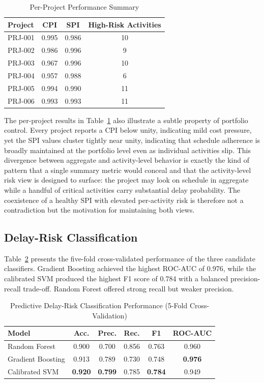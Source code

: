 \documentclass[conference]{IEEEtran}
\begin{document}
\begin{table}[t]
\caption{Per-Project Performance Summary}
\label{tab:projects}
\centering
\footnotesize
\begin{tabular}{@{}lccc@{}}
\toprule
\textbf{Project} & \textbf{CPI} & \textbf{SPI} & \textbf{High-Risk Activities} \\
\midrule
PRJ-001 & 0.995 & 0.986 & 10 \\
PRJ-002 & 0.986 & 0.996 & 9 \\
PRJ-003 & 0.967 & 0.996 & 10 \\
PRJ-004 & 0.957 & 0.988 & 6 \\
PRJ-005 & 0.994 & 0.990 & 11 \\
PRJ-006 & 0.993 & 0.993 & 11 \\
\bottomrule
\end{tabular}
\end{table}

The per-project results in Table~\ref{tab:projects} also illustrate a subtle property of portfolio control. Every project reports a CPI below unity, indicating mild cost pressure, yet the SPI values cluster tightly near unity, indicating that schedule adherence is broadly maintained at the portfolio level even as individual activities slip. This divergence between aggregate and activity-level behavior is exactly the kind of pattern that a single summary metric would conceal and that the activity-level risk view is designed to surface: the project may look on schedule in aggregate while a handful of critical activities carry substantial delay probability. The coexistence of a healthy SPI with elevated per-activity risk is therefore not a contradiction but the motivation for maintaining both views.

\subsection{Delay-Risk Classification}

Table~\ref{tab:results} presents the five-fold cross-validated performance of the three candidate classifiers. Gradient Boosting achieved the highest ROC-AUC of 0.976, while the calibrated SVM produced the highest F1 score of 0.784 with a balanced precision-recall trade-off. Random Forest offered strong recall but weaker precision.

\begin{table}[t]
\caption{Predictive Delay-Risk Classification Performance (5-Fold Cross-Validation)}
\label{tab:results}
\centering
\footnotesize
\begin{tabular}{@{}lccccc@{}}
\toprule
\textbf{Model} & \textbf{Acc.} & \textbf{Prec.} & \textbf{Rec.} & \textbf{F1} & \textbf{ROC-AUC} \\
\midrule
Random Forest & 0.900 & 0.700 & 0.856 & 0.763 & 0.960 \\
Gradient Boosting & 0.913 & 0.789 & 0.730 & 0.748 & \textbf{0.976} \\
Calibrated SVM & \textbf{0.920} & \textbf{0.799} & 0.785 & \textbf{0.784} & 0.949 \\
\bottomrule
\end{tabular}
\end{table}
\end{document}
